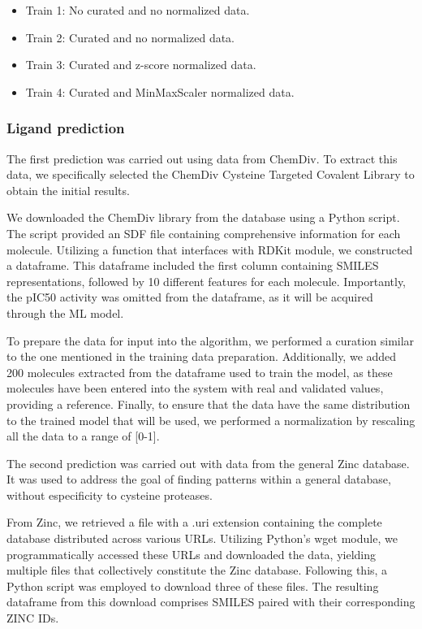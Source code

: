 \documentclass[final,times,twocolumn,article]{elsarticle}
\begin{document}
\begin{itemize}
\item Train 1: No curated and no normalized data.
\item Train 2: Curated and no normalized data.
\item Train 3: Curated and z-score normalized data.
\item Train 4: Curated and MinMaxScaler normalized data.
\end{itemize}
\subsubsection{Ligand prediction}

The first prediction was carried out using data from ChemDiv. To extract this data, we specifically selected the ChemDiv Cysteine Targeted Covalent Library to obtain the initial results. 

We downloaded the ChemDiv library from the database using a Python script. The script provided an SDF file containing comprehensive information for each molecule. Utilizing a function that interfaces with RDKit module, we constructed a dataframe. This dataframe included the first column containing SMILES representations, followed by 10 different features for each molecule. Importantly, the pIC50 activity was omitted from the dataframe, as it will be acquired through the ML model.

To prepare the data for input into the algorithm, we performed a curation similar to the one mentioned in the training data preparation. Additionally, we added 200 molecules extracted from the dataframe used to train the model, as these molecules have been entered into the system with real and validated values, providing a reference. Finally, to ensure that the data have the same distribution to the trained model that will be used, we performed a normalization by rescaling all the data to a range of [0-1]. 

The second prediction was carried out with data from the general Zinc database. It was used to address the goal of finding patterns within a general database, without especificity to cysteine proteases. 

From Zinc, we retrieved a file with a .uri extension containing the complete database distributed across various URLs. Utilizing Python's wget module, we programmatically accessed these URLs and downloaded the data, yielding multiple files that collectively constitute the Zinc database. Following this, a Python script was employed to download three of these files. The resulting dataframe from this download comprises SMILES paired with their corresponding ZINC IDs. 
\end{document}
